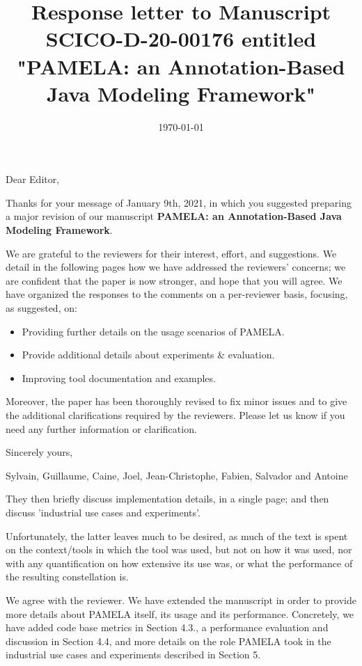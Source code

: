 \documentclass[10pt]{article}
\title{Response letter to Manuscript SCICO-D-20-00176 entitled "PAMELA: an Annotation-Based Java Modeling Framework"}
\date{\today}
\begin{document}
Dear Editor,

\bigskip
Thanks for your message of January 9th, 2021, in which you suggested preparing a major revision of our manuscript  \textbf{PAMELA: an Annotation-Based Java Modeling Framework}. 

\bigskip
We are grateful to the reviewers for their interest, effort, and suggestions. We detail in the following pages how we have addressed the reviewers' concerns; we are confident that the paper is now stronger, and hope that you will agree. We have organized the responses to the comments on a per-reviewer basis, focusing, as suggested, on: 

\begin{itemize}
\item Providing further details on the usage scenarios of PAMELA.
\item Provide additional details about experiments \& evaluation.
\item Improving tool documentation and examples.
\end{itemize}

Moreover, the paper has been thoroughly revised to fix minor issues and to give the additional clarifications required by the reviewers. Please let us know if you need any further information or clarification.

\bigskip
Sincerely yours,

\bigskip
Sylvain, Guillaume, Caine, Joel, Jean-Christophe, Fabien, Salvador and Antoine

\pagebreak


\begin{response}{They then briefly discuss implementation details, in a single page; and then discuss 'industrial use cases and experiments'.

Unfortunately, the latter leaves much to be desired, as much of the text is spent on the context/tools in which the tool was used, but not on how it was used, nor with any quantification on how extensive its use was, or what the performance of the resulting constellation is.
} We agree with the reviewer. We have extended the manuscript in order to provide more details about PAMELA itself, its usage and its performance. Concretely, we have added code base metrics in Section 4.3., a performance evaluation and discussion in Section 4.4, and more details on the role PAMELA took in the industrial use cases and experiments described in Section 5.
\end{response}
\end{document}
